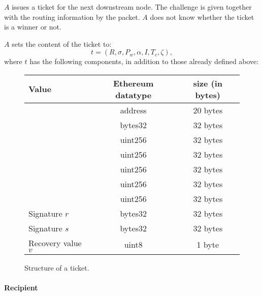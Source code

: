 $A$ issues a ticket for the next downstream node. The challenge is given together with the routing information by the packet. $A$ does not know whether the ticket is a winner or not.

$A$ sets the content of the ticket to: $$t=(R,\sigma,P_w,\alpha,I,T_c,\zeta),$$ where $t$ has the following components, in addition to those already defined above:

\begin{figure}[H]
    \centering
    \begin{tabular}{|l|c|c|}
        \hline
        \textbf{Value}                                    & \textbf{Ethereum datatype} & \textbf{size (in bytes)} \\
        \hline
        \hline
        \nameref{sec:tickets:issuance:recipient}          & address                    & 20 bytes                 \\
        \nameref{sec:tickets:issuance:challenge}          & bytes32                    & 32 bytes                 \\
        \nameref{sec:tickets:issuance:ticketepoch}        & uint256                    & 32 bytes                 \\
        \nameref{sec:tickets:issuance:ticketvalue}        & uint256                    & 32 bytes                 \\
        \nameref{sec:tickets:issuance:winningprobability} & uint256                    & 32 bytes                 \\
        \nameref{sec:tickets:issuance:ticketindex}        & uint256                    & 32 bytes                 \\
        \nameref{sec:tickets:issuance:channelepoch}       & uint256                    & 32 bytes                 \\
        \hline
        \hline
        Signature $r$                                     & bytes32                    & 32 bytes                 \\
        Signature $s$                                     & bytes32                    & 32 bytes                 \\
        Recovery value $v$                                & uint8                      & 1 byte                   \\
        \hline
    \end{tabular}
    \caption{Structure of a ticket.}
\end{figure}

\paragraph{Recipient}
\label{sec:tickets:issuance:recipient}

